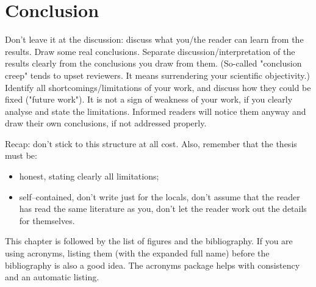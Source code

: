 \documentclass[a4paper,twoside, openright,12pt]{report}
\begin{document}



\chapter{Conclusion}

Don't leave it at the discussion: discuss what you/the reader can learn from the results. Draw some real conclusions. Separate discussion/interpretation of the results clearly from the conclusions you draw from them. (So-called "conclusion creep" tends to upset reviewers. It means surrendering your scientific objectivity.) Identify all shortcomings/limitations of your work, and discuss how they could be fixed ("future work"). It is not a sign of weakness of your work, if you clearly analyse and state the limitations. Informed readers will notice them anyway and draw their own conclusions, if not addressed properly.

\vspace{\baselineskip}
Recap: don't stick to this structure at all cost. Also, remember that the thesis must be:

\begin{itemize}
	\item honest, stating clearly all limitations;
	\item self--contained, don't write just for the locals, don't assume that the reader has read the same literature as you, don't let the reader work out the details for themselves.
\end{itemize}



This chapter is followed by the list of figures and the bibliography. If you are using acronyms, listing them (with the expanded full name) before the bibliography is also a good idea. The acronyms package helps with consistency and an automatic listing.




\cleardoublepage
{}
\listoffigures 	 %


\cleardoublepage
{}


\end{document}
